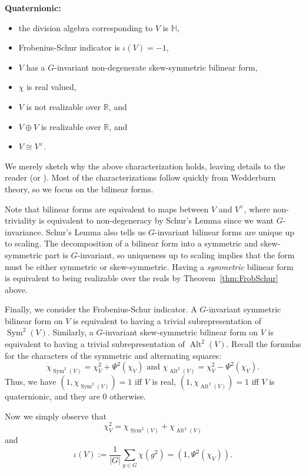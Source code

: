 \documentclass[12pt]{article}
\theoremstyle{plain}
\theoremstyle{definition}
\theoremstyle{remark}
\numberwithin{equation}{section}
\begin{document}
\noindent
\textbf{Quaternionic:}
\begin{itemize}
\item the division algebra corresponding to $V$ is $\mathbb{H}$,
\item Frobenius-Schur indicator is $\iota(V)=-1$,
\item $V$ has a $G$-invariant non-degenerate skew-symmetric bilinear form,
\item $\chi$ is real valued,
\item $V$ is not realizable over $\mathbb{R}$, and
\item $V \oplus V$ is realizable over $\mathbb{R}$, and
\item $V \cong V^\vee$.
\end{itemize}

We merely sketch why the above characterization holds,
leaving details to the reader (or \cite[\S{13.2}]{Serre}).
Most of the characterizations follow quickly from Wedderburn theory,
so we focus on the bilinear forms.

Note that bilinear forms are equivalent to maps between $V$ and
$V^\vee$, where non-triviality is equivalent to non-degeneracy by
Schur's Lemma since we want $G$-invariance.
Schur's Lemma also tells us $G$-invariant bilinear forms
are unique up to scaling.
The decomposition of a bilinear form into a symmetric and skew-symmetric
part is $G$-invariant, so uniqueness up to scaling implies that the form
must be either symmetric or skew-symmetric.
Having a \emph{symmetric} bilinear form is equivalent to being realizable over
the reals by Theorem~\ref{thm:FrobSchur} above.

Finally, we consider the Frobenius-Schur indicator.
A $G$-invariant symmetric bilinear form on $V$ is equivalent to
having a trivial subrepresentation of $\operatorname{Sym}^2(V)$.
Similarly, a $G$-invariant skew-symmetric bilinear form on $V$
is equivalent to having a trivial subrepresentation of
$\operatorname{Alt}^2(V)$.
Recall the formulas for the characters of the
symmetric and alternating squares:
\[
\chi_{\operatorname{Sym}^2(V)} = \chi_V^2 + \Psi^2(\chi_V)
\textrm{ and }
\chi_{\operatorname{Alt}^2(V)} = \chi_V^2 - \Psi^2(\chi_V).
\]
Thus, we have $(1,\chi_{\operatorname{Sym}^2(V)})=1$ iff $V$ is real,
$(1,\chi_{\operatorname{Alt}^2(V)})=1$ iff $V$ is quaternionic,
and they are $0$ otherwise.

Now we simply observe that
\[
\chi_V^2 = \chi_{\operatorname{Sym}^2(V)} + \chi_{\operatorname{Alt}^2(V)}
\]
and
\[
\iota(V) := \frac{1}{|G|}\sum_{g \in G} \chi(g^2)
=(1, \Psi^2(\chi_V)).
\]



\end{document}
